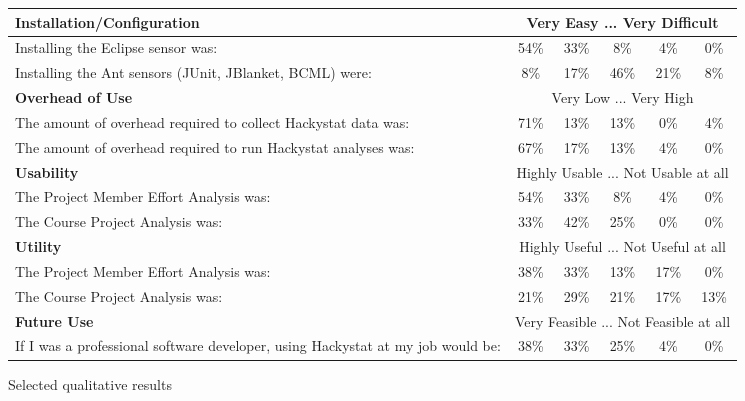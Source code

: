 \documentclass[10pt,twocolumn]{article}
\begin{document}
\begin{figure*}[ht]
\small
\centering
\begin{tabular}{|p{4.5in}|c|c|c|c|c|} \hline
{\bf Installation/Configuration} & \multicolumn{5}{|c|}{Very Easy \hfill ... \hfill Very Difficult} \\ \hline
Installing the Eclipse sensor was: & 54\% & 33\% & 8\% & 4\% & 0\% \\ \hline
Installing the Ant sensors (JUnit, JBlanket, BCML) were:   & 8\%  & 17\% & 46\% & 21\% & 8\% \\ \hline \hline
{\bf Overhead of Use} & \multicolumn{5}{|c|}{Very Low \hfill ... \hfill Very High} \\ \hline
The amount of overhead required to collect Hackystat data was: 
                                   & 71\%  & 13\% & 13\% & 0\% & 4\% \\ \hline
The amount of overhead required to run Hackystat analyses was: 
                                   & 67\%  & 17\% & 13\% & 4\% & 0\% \\ \hline \hline
{\bf Usability} & \multicolumn{5}{|c|}{Highly Usable \hfill ... \hfill Not Usable at all} \\ \hline
The Project Member Effort Analysis was: 
                                   & 54\%  & 33\% & 8\% & 4\% & 0\% \\ \hline
The Course Project Analysis was: 
                                   & 33\%  & 42\% & 25\% & 0\% & 0\% \\ \hline \hline
{\bf Utility} & \multicolumn{5}{|c|}{Highly Useful \hfill ... \hfill Not Useful at all} \\ \hline
The Project Member Effort Analysis was: 
                                   & 38\%  & 33\% & 13\% & 17\% & 0\% \\ \hline
The Course Project Analysis was: 
                                   & 21\%  & 29\% & 21\% & 17\% & 13\% \\ \hline \hline
{\bf Future Use} & \multicolumn{5}{|c|}{Very Feasible \hfill ... \hfill Not Feasible at all} \\ \hline
If I was a professional software developer, using Hackystat at my job would be:
                                   & 38\%  & 33\% & 25\% & 4\% & 0\% \\ \hline

\end{tabular}
\normalsize
\caption{Selected qualitative results}
\label{fig:survey}
\end{figure*}
\end{document}
